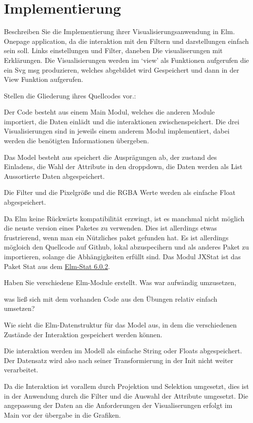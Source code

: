 \documentclass[usegeometry=true]{scrartcl}
\begin{document}
\section{Implementierung}
Beschreiben Sie die Implementierung ihrer Visualisierungsanwendung in Elm. 
Onepage application, da die interaktion mit den Filtern und darstellungen einfach sein soll.
Links einstellungen und Filter, daneben Die visualiserungen mit Erklärungen.
Die Visualisierungen werden im `view' als Funktionen aufgerufen die ein Svg msg produzieren, welches abgebildet wird 
 Gespeichert und dann in der View Funktion aufgerufen.


Stellen die Gliederung ihres Quellcodes vor.:

Der Code besteht aus einem Main Modul, welches die anderen Module importiert, die Daten einlädt und die interaktionen zwischenspeichert.
Die drei Visualisierungen sind in jeweils einem anderem Modul implementiert, dabei werden die benötigten Informationen übergeben.

Das Model besteht aus speichert die Ausprägungen ab, der zustand des Einladens, 
die Wahl der Attribute in den droppdown, die Daten werden als List Aussortierte Daten abgespeichert.


Die Filter und die Pixelgröße und die RGBA Werte werden als einfache Float abgespeichert.

Da Elm keine Rückwärts kompatibilität erzwingt, ist es manchmal nicht möglich die neuste version eines Paketes zu verwenden. 
Dies ist allerdings etwas frustrierend, wenn man ein Nützliches paket gefunden hat. Es ist allerdings mögloich den Quellcode auf 
Github, lokal abzuspecihern und als anderes Paket zu importieren, solange die Abhängigkeiten erfüllt sind. Das Modul JXStat ist das Paket Stat aus dem \href{https://github.com/jxxcarlson/elm-stat/blob/6.0.2/src/Stat.elm}{Elm-Stat 6.0.2}. 

 Haben Sie verschiedene Elm-Module erstellt. Was war aufwändig umzusetzen, 

 was ließ sich mit dem vorhanden Code aus den Übungen relativ einfach umsetzen? 

Wie sieht die Elm-Datenstruktur für das Model aus, in dem die verschiedenen Zustände der Interaktion gespeichert werden können.

Die interaktion werden im Modell als einfache String oder Floats abgespeichert. Der Datensatz wird also nach seiner Transformierung in der Init  nicht weiter verarbeitet.

Da die Interaktion ist vorallem durch Projektion und Selektion umgesetzt, dies ist in der Anwendung durch die Filter und die Auswahl der Attribute umgesetzt.
Die angepassung der Daten an die Anforderungen der Visualiserungen erfolgt im Main vor der übergabe in die Grafiken. 
\end{document}
